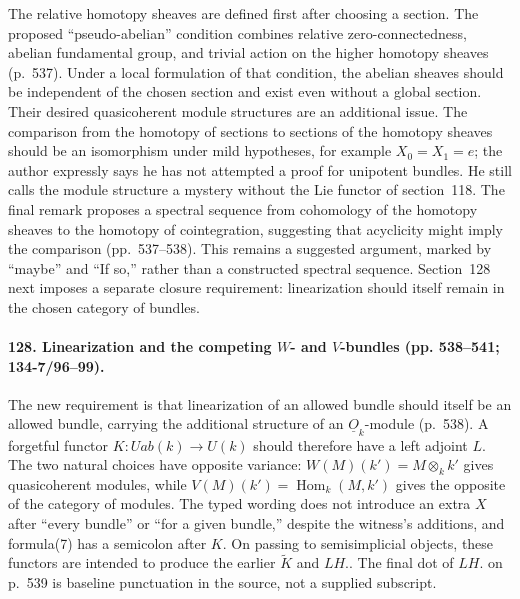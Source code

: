 The relative homotopy sheaves are defined first after choosing a section. The proposed ``pseudo-abelian'' condition combines relative zero-connectedness, abelian fundamental group, and trivial action on the higher homotopy sheaves (p.~537). Under a local formulation of that condition, the abelian sheaves should be independent of the chosen section and exist even without a global section. Their desired quasicoherent module structures are an additional issue. The comparison from the homotopy of sections to sections of the homotopy sheaves should be an isomorphism under mild hypotheses, for example $X_0=X_1=e$; the author expressly says he has not attempted a proof for unipotent bundles. He still calls the module structure a mystery without the Lie functor of section~118. The final remark proposes a spectral sequence from cohomology of the homotopy sheaves to the homotopy of cointegration, suggesting that acyclicity might imply the comparison (pp.~537--538). This remains a suggested argument, marked by ``maybe'' and ``If so,'' rather than a constructed spectral sequence. Section~128 next imposes a separate closure requirement: linearization should itself remain in the chosen category of bundles.

\paragraph{128. Linearization and the competing $W$- and $V$-bundles (pp. 538--541; 134-7/96--99).}
The new requirement is that linearization of an allowed bundle should itself be an allowed bundle, carrying the additional structure of an $\underline O_k$-module (p.~538). A forgetful functor $K:Uab(k)\to U(k)$ should therefore have a left adjoint $L$. The two natural choices have opposite variance: $W(M)(k')=M\otimes_k k'$ gives quasicoherent modules, while $V(M)(k')=\operatorname{Hom}_k(M,k')$ gives the opposite of the category of modules. The typed wording does not introduce an extra $X$ after ``every bundle'' or ``for a given bundle,'' despite the witness's additions, and formula(7) has a semicolon after $K$. On passing to semisimplicial objects, these functors are intended to produce the earlier $\widetilde K$ and $LH.$. The final dot of $LH.$ on p.~539 is baseline punctuation in the source, not a supplied subscript.

